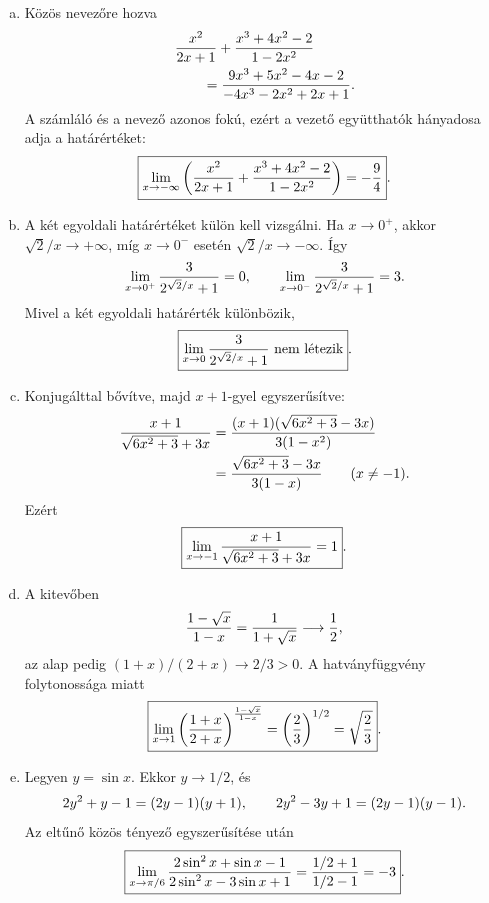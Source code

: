 \documentclass{szb-solution}
\begin{document}
\begin{enumerate}[a)]
  \item Közös nevezőre hozva
        \begin{align*}
          &\frac{x^2}{2x+1}+\frac{x^3+4x^2-2}{1-2x^2}\\
          &\qquad=
          \frac{9x^3+5x^2-4x-2}{-4x^3-2x^2+2x+1}
          \text.
        \end{align*}
        A számláló és a nevező azonos fokú, ezért a vezető együtthatók
        hányadosa adja a határértéket:
        $$
          \boxed{\displaystyle
          \lim_{x\to-\infty}\left(
          \frac{x^2}{2x+1}+\frac{x^3+4x^2-2}{1-2x^2}
          \right)=-\frac94}
          \text.
        $$

  \item A két egyoldali határértéket külön kell vizsgálni. Ha $x\to0^+$,
        akkor $\sqrt2/x\to+\infty$, míg $x\to0^-$ esetén
        $\sqrt2/x\to-\infty$. Így
        $$
          \lim_{x\to0^+}\frac3{2^{\sqrt2/x}+1}=0,
          \qquad
          \lim_{x\to0^-}\frac3{2^{\sqrt2/x}+1}=3
          \text.
        $$
        Mivel a két egyoldali határérték különbözik,
        $$
          \boxed{\displaystyle
          \lim_{x\to0}\frac3{2^{\sqrt2/x}+1}\text{ nem létezik}}
          \text.
        $$

  \item Konjugálttal bővítve, majd $x+1$-gyel egyszerűsítve:
        \begin{align*}
          \frac{x+1}{\sqrt{6x^2+3}+3x}
          &=\frac{(x+1)(\sqrt{6x^2+3}-3x)}{3(1-x^2)}\\
          &=\frac{\sqrt{6x^2+3}-3x}{3(1-x)}
          \qquad(x\neq-1)
          \text.
        \end{align*}
        Ezért
        $$
          \boxed{\displaystyle
          \lim_{x\to-1}\frac{x+1}{\sqrt{6x^2+3}+3x}=1}
          \text.
        $$

  \item A kitevőben
        $$
          \frac{1-\sqrt x}{1-x}
          =\frac1{1+\sqrt x}\longrightarrow\frac12
          \text,
        $$
        az alap pedig $(1+x)/(2+x)\to2/3>0$. A hatványfüggvény
        folytonossága miatt
        $$
          \boxed{\displaystyle
          \lim_{x\to1}\left(\frac{1+x}{2+x}\right)^{
          \frac{1-\sqrt x}{1-x}}
          =\left(\frac23\right)^{1/2}=\sqrt{\frac23}}
          \text.
        $$

  \item Legyen $y=\sin x$. Ekkor $y\to1/2$, és
        $$
          2y^2+y-1=(2y-1)(y+1),
          \qquad
          2y^2-3y+1=(2y-1)(y-1)
          \text.
        $$
        Az eltűnő közös tényező egyszerűsítése után
        $$
          \boxed{\displaystyle
          \lim_{x\to\pi/6}
          \frac{2\sin^2x+\sin x-1}{2\sin^2x-3\sin x+1}
          =\frac{1/2+1}{1/2-1}=-3}
          \text.
        $$


\end{enumerate}
\end{document}
